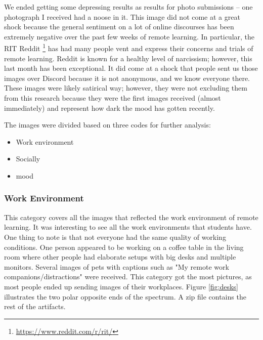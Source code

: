 \documentclass[12pt,
 reprint,
nofootinbib,
 amsmath,amssymb,
 aps,
floatfix,
]{revtex4-2}
\begin{document}
We ended getting some depressing results as results for photo submissions -- one photograph I received had a noose in it. This image did not come at a great shock because the general sentiment on a lot of online discourses has been extremely negative over the past few weeks of remote learning. In particular, the RIT Reddit \footnote{\url{https://www.reddit.com/r/rit/}} has had many people vent and express their concerns and trials of remote learning. Reddit is known for a healthy level of narcissism; however, this last month has been exceptional. It did come at a shock that people sent us those images over Discord because it is not anonymous, and we know everyone there. These images were likely satirical way; however,  they were not excluding them from this research because they were the first images received (almost immediately) and represent how dark the mood has gotten recently.

The images were divided based on three codes for further analysis:

\begin{itemize}
    \item Work environment
    \item Socially
    \item mood
\end{itemize}

\subsubsection{Work Environment}

This category covers all the images that reflected the work environment of remote learning. It was interesting to see all the work environments that students have. One thing to note is that not everyone had the same quality of working conditions. One person appeared to be working on a coffee table in the living room where other people had elaborate setups with big desks and multiple monitors. Several images of pets with captions such as "My remote work companions/distractions" were received. This category got the most pictures, as most people ended up sending images of their workplaces. Figure \ref{fig:desks} illustrates the two polar opposite ends of the spectrum. A zip file contains the rest of the artifacts.
\end{document}
